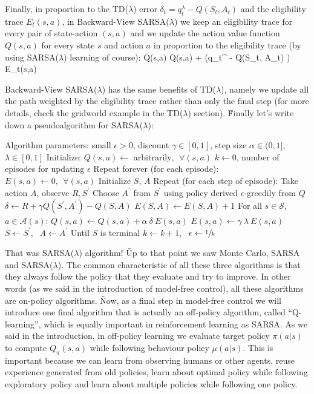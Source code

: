 Finally, in proportion to the TD($\lambda$) error $\delta_t = q_t^\lambda - Q(S_t, A_t)$ and the eligibility trace
$E_t(s,a)$, in Backward-View SARSA($\lambda$) we keep an eligibility trace for every pair of state-action $(s,a)$
and we update the action value function $Q(s,a)$ for every state $s$ and action $a$ in proportion to the eligibility
trace (by using SARSA($\lambda$) learning of course):
\bse
Q(s,a) \gets Q(s,a) + \alpha \left(q_t^{\lambda} - Q(S_t, A_t) \right) E_t(s,a)
\ese

Backward-View SARSA($\lambda$) has the same benefits of TD($\lambda$), namely we update all the path weighted by the
eligibility trace rather than only the final step (for more details, check the gridworld example in the
TD($\lambda$) section). \v

Finally let's write down a pseudoalgorithm for SARSA($\lambda$):

\begin{block}
Algorithm parameters: small $\epsilon > 0$, discount $\gamma \in [0,1]$, step size $\alpha \in (0,1]$, $\lambda \in [0,1]$
Initialize:
    $Q(s,a) \gets$ arbitrarily$, \:\: \forall (s,a)$
    $k \gets 0$, number of episodes for updating $\epsilon$
Repeat forever (for each episode):
    $E(s,a) \gets 0, \:\: \forall (s,a)$
    Initialize $S$, $A$
    Repeat (for each step of episode):
        Take action $A$, observe $R, S^\prime$
        Choose $A^\prime$ from $S^\prime$ using policy derived $\epsilon$-greedily from $Q$
        $\delta \gets R + \gamma Q(S^\prime, A^\prime) - Q(S,A)$
        $E(S,A) \gets E(S,A) + 1$
        For all $s \in \mathcal{S}$, $a \in \mathcal{A}(s)$:
            $Q(s,a) \gets Q(s,a) + \alpha \: \delta \: E(s,a)$
            $E(s,a) \gets \gamma \: \lambda \: E(s,a)$
        $S \gets S^\prime$, $\:\: A \gets A^\prime$
    Until $S$ is terminal
    $k \gets k+1$, $\:\: \epsilon \gets \sfrac{1}{k}$
\end{block}

That was SARSA($\lambda$) algorithm! \v

Up to that point we saw Monte Carlo, SARSA and SARSA($\lambda$). The common characteristic of all these three
algorithms is that they always follow the policy that they evaluate and try to improve. In other words (as we said
in the introduction of model-free control), all these algorithms are on-policy algorithms. \v

Now, as a final step in model-free control we will introduce one final algorithm that is actually an off-policy
algorithm, called ``Q-learning'', which is equally important in reinforcement learning as SARSA. As we said in the
introduction, in off-policy learning we evaluate target policy $\pi(a|s)$ to compute $Q_{\pi}(s,a)$ while following
behaviour policy $\mu(a|s)$. This is important because we can learn from observing humans or other agents, reuse
experience generated from old policies, learn about optimal policy while following exploratory policy and learn
about multiple policies while following one policy.

